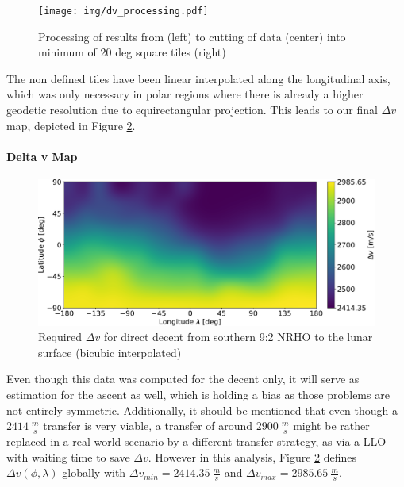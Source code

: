 \documentclass[utf8]{FrontiersinHarvard} %
\begin{document}
\begin{figure}[h!]
\begin{center}
\texttt{[image: img/dv\_processing.pdf]}
\end{center}
\caption{Processing of results from \cite{Trofimov2020} (left) to cutting of data (center) into minimum of 20 deg square tiles (right)}
\label{fig:dv_processing}
\end{figure}

The non defined tiles have been linear interpolated along the longitudinal axis, which was only necessary in polar regions where there is already a higher geodetic resolution due to equirectangular projection.
This leads to our final $\Delta v$ map, depicted in Figure \ref{fig:dv_NRHO}. 

\paragraph{Delta v Map}
\label{sec:dv-map}

\begin{figure}[h!]
\begin{center}
\includegraphics[width=\linewidth]{img/dv_NRHO.pdf}
\end{center}
\caption{Required $\Delta v$ for direct decent from southern 9:2 NRHO to the lunar surface (bicubic interpolated)}
\label{fig:dv_NRHO}
\end{figure}

Even though this data was computed for the decent only, it will serve as estimation for the ascent as well, which is holding a bias as those problems are not entirely symmetric.
Additionally, it should be mentioned that even though a $2414 \ \frac{m}{s}$ transfer is very viable, a transfer of around $2900 \ \frac{m}{s}$ might be rather replaced in a real world scenario by a different transfer strategy, as via a LLO with waiting time to save $\Delta v$.
However in this analysis, Figure \ref{fig:dv_NRHO} defines $\Delta v(\phi,\lambda)$ globally with $\Delta v_{min}=2414.35 \ \frac{m}{s}$ and $\Delta v_{max}=2985.65 \ \frac{m}{s}$.
 
\end{document}
